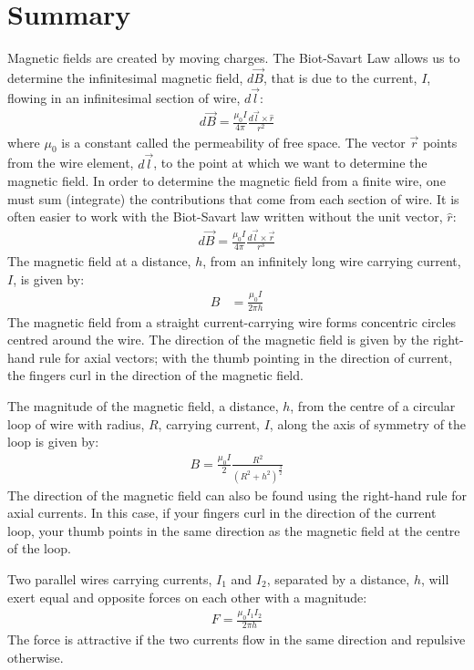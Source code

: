 \newpage
\section{Summary}

\begin{chapterSummary}
Magnetic fields are created by moving charges. The Biot-Savart Law allows us to determine the infinitesimal magnetic field, $d\vec B$, that is due to the current, $I$, flowing in an infinitesimal section of wire, $d\vec l$:
\begin{align*}
d\vec B = \frac{\mu_0 I}{4\pi}\frac{d\vec l\times \hat r}{r^2}
\end{align*}
where $\mu_0$ is a constant called the permeability of free space. The vector $\vec r$ points from the wire element, $d\vec l$, to the point at which we want to determine the magnetic field. In order to determine the magnetic field from a finite wire, one must sum (integrate) the contributions that come from each section of wire. It is often easier to work with the Biot-Savart law written without the unit vector, $\hat r$:
\begin{align*}
d\vec B = \frac{\mu_0 I}{4\pi}\frac{d\vec l\times \vec r}{r^3}
\end{align*}
The magnetic field at a distance, $h$, from an infinitely long wire carrying current, $I$, is given by:
\begin{align*}
B&=\frac{\mu_0 I}{2\pi h}
\end{align*}
The magnetic field from a straight current-carrying wire forms concentric circles centred around the wire. The direction of the magnetic field is given by the right-hand rule for axial vectors; with the thumb pointing in the direction of current, the fingers curl in the direction of the magnetic field. 

The magnitude of the magnetic field, a distance, $h$, from the centre of a circular loop of wire with radius, $R$, carrying current, $I$, along the axis of symmetry of the loop is given by:
\begin{align*}
B=\frac{\mu_0 I}{2} \frac{R^2}{(R^2+h^2)^\frac{3}{2}}
\end{align*}
The direction of the magnetic field can also be found using the right-hand rule for axial currents. In this case, if your fingers curl in the direction of the current loop, your thumb points in the same direction as the magnetic field at the centre of the loop.

Two parallel wires carrying currents, $I_1$ and $I_2$, separated by a distance, $h$, will exert equal and opposite forces on each other with a magnitude:
\begin{align*}
F = \frac{\mu_0I_1I_2}{2\pi h}
\end{align*}
The force is attractive if the two currents flow in the same direction and repulsive otherwise.


\end{chapterSummary}
